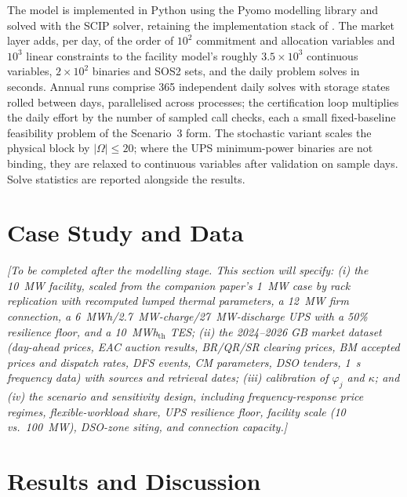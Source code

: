 \documentclass[lettersize,journal]{IEEEtran}
\begin{document}
The model is implemented in Python using the Pyomo modelling library and solved with the SCIP solver, retaining the implementation stack of \cite{takci2026characterisation}. The market layer adds, per day, of the order of $10^2$ commitment and allocation variables and $10^3$ linear constraints to the facility model's roughly $3.5 \times 10^3$ continuous variables, $2 \times 10^2$ binaries and SOS2 sets, and the daily problem solves in seconds. Annual runs comprise 365 independent daily solves with storage states rolled between days, parallelised across processes; the certification loop multiplies the daily effort by the number of sampled call checks, each a small fixed-baseline feasibility problem of the Scenario~3 form. The stochastic variant scales the physical block by $|\Omega| \leq 20$; where the UPS minimum-power binaries are not binding, they are relaxed to continuous variables after validation on sample days. Solve statistics are reported alongside the results.

\section{Case Study and Data}\label{sec:casestudy}

\textit{[To be completed after the modelling stage. This section will specify: (i) the 10~MW facility, scaled from the companion paper's 1~MW case by rack replication with recomputed lumped thermal parameters, a 12~MW firm connection, a 6~MWh/2.7~MW-charge/27~MW-discharge UPS with a 50\% resilience floor, and a 10~MWh$_{\mathrm{th}}$ TES; (ii) the 2024--2026 GB market dataset (day-ahead prices, EAC auction results, BR/QR/SR clearing prices, BM accepted prices and dispatch rates, DFS events, CM parameters, DSO tenders, 1~s frequency data) with sources and retrieval dates; (iii) calibration of $\varphi_j$ and $\kappa$; and (iv) the scenario and sensitivity design, including frequency-response price regimes, flexible-workload share, UPS resilience floor, facility scale (10 vs.\ 100~MW), DSO-zone siting, and connection capacity.]}

\section{Results and Discussion}\label{sec:results}
\end{document}
